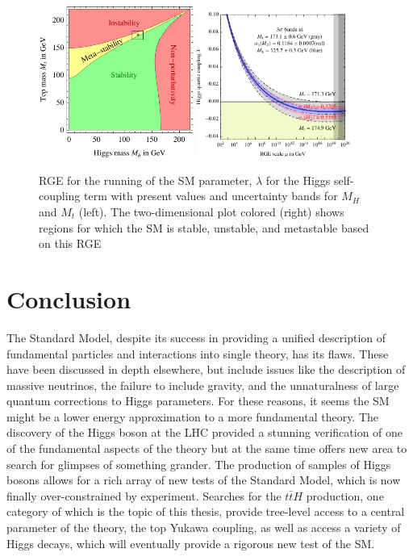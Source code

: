 \begin{figure}[!t]
\centering 
\includegraphics[width=0.45\textwidth]{figs/SMstability.pdf}
\includegraphics[width=0.45\textwidth]{figs/runLambda.pdf}
\caption {
  RGE for the running of the SM parameter, $\lambda$ for the Higgs self-coupling term 
  with present values and uncertainty bands for $M_H$ and $M_t$ (left). The two-dimensional
  plot colored (right) shows regions for which the SM is stable, unstable, and metastable
  based on this RGE}

\label{figure:theory_stability}

\end{figure}


\section{Conclusion}

The Standard Model, despite its success in providing a unified description of fundamental
particles and interactions into single theory, has its flaws. These have been discussed in 
depth elsewhere, but include issues like the description of massive neutrinos, the failure
to include gravity, and the unnaturalness of large quantum corrections to Higgs parameters.
For these reasons, it seems the SM might be a lower energy approximation to a more fundamental
theory. The discovery of the Higgs boson at the LHC provided a stunning verification of one
of the fundamental aspects of the theory but at the same time offers new area to search for
glimpses of something grander. The production of samples of Higgs bosons
allows for a rich array of new tests of the Standard Model, which is now finally over-constrained by experiment. 
Searches for the $t\bar{t}H$ production, one category of which is the topic
of this thesis, provide tree-level access to a central parameter of the theory, the top Yukawa coupling,
as well as access a variety of Higgs decays, which will eventually provide a rigorous new 
test of the SM. 


